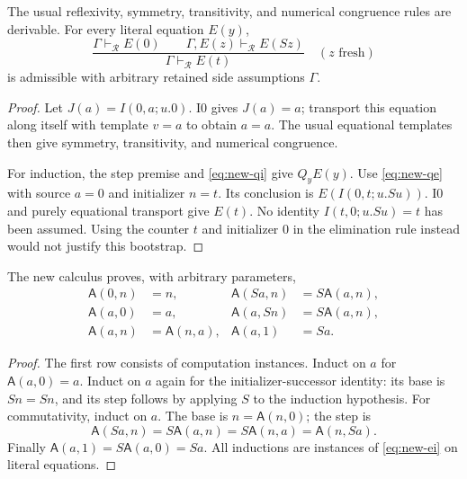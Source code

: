 \begin{lemma}
\label{lem:new-ei}
The usual reflexivity, symmetry, transitivity, and numerical congruence rules
are derivable.  For every literal equation $E(y)$,
\begin{equation}
 \frac{\Gamma\vdash_{\mathcal R}E(0)\qquad
       \Gamma,E(z)\vdash_{\mathcal R}E(Sz)}
      {\Gamma\vdash_{\mathcal R}E(t)}
 \quad(z\text{ fresh})
 \label{eq:new-ei}
\end{equation}
is admissible with arbitrary retained side assumptions $\Gamma$.
\end{lemma}
\begin{proof}
Let $J(a)=I(0,a;u.0)$.  I0 gives $J(a)=a$; transport this equation along
itself with template $v=a$ to obtain $a=a$.  The usual equational templates
then give symmetry, transitivity, and numerical congruence.

For induction, the step premise and \eqref{eq:new-qi} give $Q_yE(y)$.
Use \eqref{eq:new-qe} with source $a=0$ and initializer $n=t$.  Its conclusion
is $E(I(0,t;u.Su))$.  I0 and purely equational transport give $E(t)$.
No identity $I(t,0;u.Su)=t$ has been assumed.  Using the counter $t$ and
initializer $0$ in the elimination rule instead would not justify this
bootstrap.
\end{proof}

\begin{lemma}
\label{lem:new-addition}
The new calculus proves, with arbitrary parameters,
\begin{equation}
 \begin{aligned}
 \mathsf A(0,n)&=n,&
 \mathsf A(Sa,n)&=S\mathsf A(a,n),\\
 \mathsf A(a,0)&=a,&
 \mathsf A(a,Sn)&=S\mathsf A(a,n),\\
 \mathsf A(a,n)&=\mathsf A(n,a),&
 \mathsf A(a,1)&=Sa.
 \end{aligned}
 \label{eq:new-add-identities}
\end{equation}
\end{lemma}
\begin{proof}
The first row consists of computation instances.  Induct on $a$ for
$\mathsf A(a,0)=a$.  Induct on $a$ again for the initializer-successor
identity: its base is $Sn=Sn$, and its step follows by applying $S$ to the
induction hypothesis.  For commutativity, induct on $a$.  The base is
$n=\mathsf A(n,0)$; the step is
\[
 \mathsf A(Sa,n)=S\mathsf A(a,n)
               =S\mathsf A(n,a)=\mathsf A(n,Sa).
\]
Finally $\mathsf A(a,1)=S\mathsf A(a,0)=Sa$.
All inductions are instances of \eqref{eq:new-ei} on literal equations.
\end{proof}

